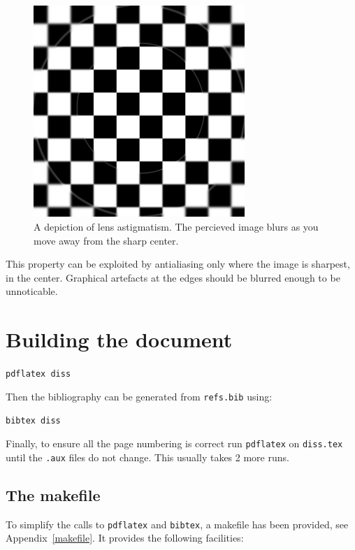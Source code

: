 \documentclass[12pt,a4paper,twoside,openright]{report}
\begin{document}
\begin{figure}
\centerline{\includegraphics[width=8cm]{figs/blur.png}}
\caption{A depiction of lens astigmatism. The percieved image blurs as you move away from the sharp center.}
\label{blurred}
\end{figure}

This property can be exploited by antialiasing only where the image is sharpest, in the center. Graphical artefacts at the edges should be blurred enough to be unnoticable.

\section{Building the document}


\texttt{pdflatex diss}

\noindent
Then the bibliography can be generated from \texttt{refs.bib} using:

\texttt{bibtex diss}

\noindent
Finally, to ensure all the page numbering is correct run \texttt{pdflatex}
on \texttt{diss.tex} until the \texttt{.aux} files do not change.  This
usually takes 2 more runs.

\subsection{The makefile}

To simplify the calls to \texttt{pdflatex} and \texttt{bibtex}, 
a makefile has been provided, see Appendix~\ref{makefile}. 
It provides the following facilities:
\end{document}
